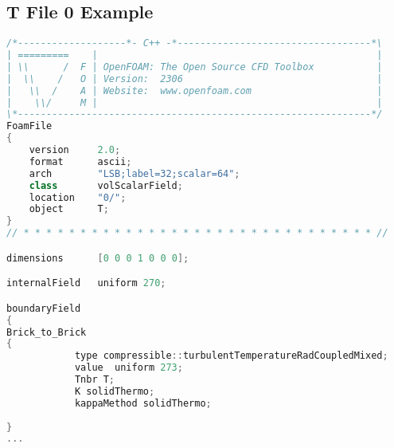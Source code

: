\begin{theappendices}
\chapter{T File 0 Example}
\begin{lstlisting}[language=c++, caption=OF dictiorary in $0/Brick/T$]
/*-------------------*- C++ -*----------------------------------*\
| =========    |                                                 |
| \\      /  F | OpenFOAM: The Open Source CFD Toolbox           |
|  \\    /   O | Version:  2306                                  |
|   \\  /    A | Website:  www.openfoam.com                      |
|    \\/     M |                                                 |
\*--------------------------------------------------------------*/
FoamFile
{
    version     2.0;
    format      ascii;
    arch        "LSB;label=32;scalar=64";
    class       volScalarField;
    location    "0/";
    object      T;
}
// * * * * * * * * * * * * * * * * * * * * * * * * * * * * * * * //

dimensions      [0 0 0 1 0 0 0];

internalField   uniform 270;

boundaryField
{
Brick_to_Brick
{
            type compressible::turbulentTemperatureRadCoupledMixed;
            value  uniform 273;
            Tnbr T;
            K solidThermo;
            kappaMethod solidThermo;
            
}
...
\end{lstlisting}




\singlespacing

\end{theappendices}
